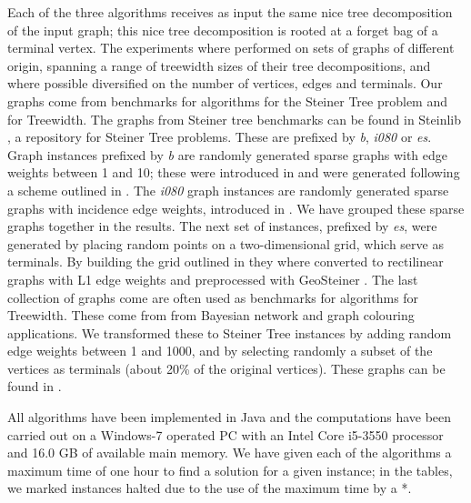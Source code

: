 \documentclass{llncs}
\begin{document}
Each of the three algorithms receives as input the same nice tree decomposition of the input graph; this nice tree decomposition is rooted at a forget bag of a terminal vertex.
The experiments where performed on sets of graphs of different origin, spanning a range of treewidth sizes of their tree decompositions, and where possible diversified on the number of vertices, edges and terminals. 
Our graphs come from benchmarks for algorithms for the {\sc Steiner Tree} problem and for Treewidth. The graphs from Steiner tree benchmarks can be
found in Steinlib \cite{KochMV}, a repository for Steiner Tree problems. These are prefixed by \emph{b}, \emph{i080} or \emph{es}.
Graph instances prefixed by \emph{b} are randomly generated sparse graphs with edge weights between 1 and 10; these were introduced in \cite{Beasley84} and were generated following a scheme outlined in \cite{Aneja80}.
The \emph{i080} graph instances are randomly generated sparse graphs with incidence edge weights, introduced in \cite{Duin93}. We have grouped these sparse graphs together in the results. The next set of instances, prefixed by \emph{es}, were generated by placing random points on a two-dimensional grid, which serve as terminals. By building the grid outlined in \cite{Hanan66} they where converted to rectilinear graphs with L1 edge weights and preprocessed with GeoSteiner \cite{WarmeWZ}.
The last collection of graphs come are often used as benchmarks for algorithms for {\sc Treewidth}. These
come from 
from Bayesian network and graph colouring applications. 
We transformed these to {\sc Steiner Tree} instances by adding random edge weights between 1 and 1000, and by selecting randomly a
subset of the vertices as terminals (about 20\% of the original vertices). These graphs can be found in \cite{treewidthlib}.

All algorithms have been implemented in Java and the computations have been carried out on a Windows-7 operated PC with an Intel Core i5-3550 processor and 16.0 GB of available main memory. 
We have given each of the algorithms a maximum time of one hour to find a solution for a given instance; in the tables,
we marked instances halted due to the use of the maximum time by a *.
\end{document}
